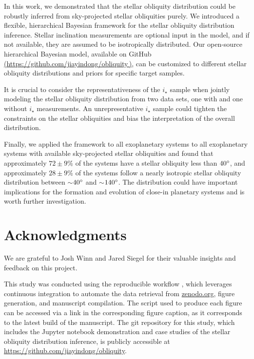 \documentclass[twocolumn,times]{aastex631}
\begin{document}
In this work, we demonstrated that the stellar obliquity distribution could be robustly inferred from sky-projected stellar obliquities purely.
We introduced a flexible, hierarchical Bayesian framework for the stellar obliquity distribution inference. Stellar inclination measurements are optional input in the model, and if not available, they are assumed to be isotropically distributed.
Our open-source hierarchical Bayesian model, available on GitHub \href{https://github.com/jiayindong/obliquity}{(https://github.com/jiayindong/obliquity\,\faGithub)}, can be customized to different stellar obliquity distributions and priors for specific target samples.

It is crucial to consider the representativeness of the $i_\star$ sample when jointly modeling the stellar obliquity distribution from two data sets, one with and one without $i_\star$ measurements. An unrepresentative $i_\star$ sample could tighten the constraints on the stellar obliquities and bias the interpretation of the overall distribution.

Finally, we applied the framework to all exoplanetary systems to all exoplanetary systems with available sky-projected stellar obliquities and found that approximately $72\pm9$\% of the systems have a stellar obliquity less than $40\mbox{$^\circ$}$, and approximately $28\pm9$\% of the systems follow a nearly isotropic stellar obliquity distribution between $\sim$$40\mbox{$^\circ$}$ and $\sim$$140\mbox{$^\circ$}$.
The distribution could have important implications for the formation and evolution of close-in planetary systems and is worth further investigation.

\section*{Acknowledgments}
We are grateful to Josh Winn and Jared Siegel for their valuable insights and feedback on this project.

This study was conducted using the \href{https://github.com/showyourwork/showyourwork}{\showyourwork} reproducible workflow \citep{Luger2021}, which leverages continuous integration to automate the data retrieval from \href{https://zenodo.org/}{zenodo.org}, figure generation, and manuscript compilation.
The script used to produce each figure can be accessed via a link in the corresponding figure caption, as it corresponds to the latest build of the manuscript.
The git repository for this study, which includes the Jupyter notebook demonstration and case studies of the stellar obliquity distribution inference, is publicly accessible at \url{https://github.com/jiayindong/obliquity}.

\vspace*{5mm}



\end{document}
